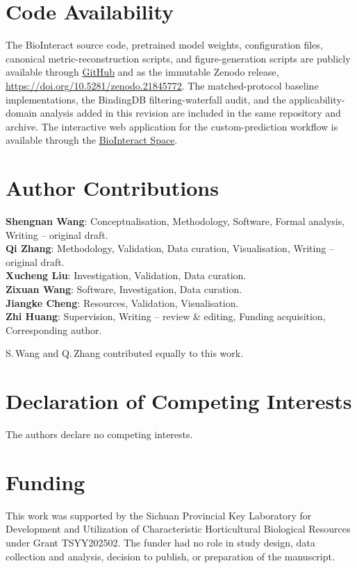 \documentclass[fleqn,10pt]{wlscirep}
\begin{document}
\section*{Code Availability}

The BioInteract source code, pretrained model weights, configuration files,
canonical metric-reconstruction scripts, and figure-generation scripts are
publicly available through \href{https://github.com/Liubo-520/bio-intelligence}{GitHub} and
as the immutable Zenodo release, \url{https://doi.org/10.5281/zenodo.21845772}.
The matched-protocol baseline implementations, the BindingDB filtering-waterfall
audit, and the applicability-domain analysis added in this revision are included
in the same repository and archive.
The interactive web
application for the custom-prediction workflow is available through the
\href{https://huggingface.co/spaces/AI4deeperScience/BioInteract}{BioInteract Space}.

\section*{Author Contributions}

\textbf{Shengnan Wang}: Conceptualisation, Methodology, Software, Formal
analysis, Writing -- original draft. \\
\textbf{Qi Zhang}: Methodology, Validation, Data curation, Visualisation,
Writing -- original draft. \\
\textbf{Xucheng Liu}: Investigation, Validation, Data curation. \\
\textbf{Zixuan Wang}: Software, Investigation, Data curation. \\
\textbf{Jiangke Cheng}: Resources, Validation, Visualisation. \\
\textbf{Zhi Huang}: Supervision, Writing -- review \& editing, Funding
acquisition, Corresponding author.

\vspace{0.5em}
\noindent S.\,Wang and Q.\,Zhang contributed equally to this work.

\section*{Declaration of Competing Interests}

The authors declare no competing interests.

\section*{Funding}

This work was supported by the Sichuan Provincial Key Laboratory for Development and Utilization of Characteristic Horticultural Biological Resources under Grant TSYY202502. The funder had no role in study design, data collection and analysis, decision to publish, or preparation of the manuscript.


\end{document}
